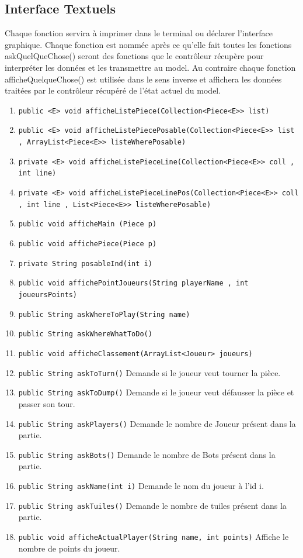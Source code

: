 \documentclass[11pt]{article}
\begin{document}
\subsection{Interface Textuels}
\label{sec:org1bb8284}
Chaque fonction servira à imprimer dans le terminal ou déclarer l'interface graphique. Chaque fonction est nommée après ce qu’elle fait toutes les fonctions askQuelQueChose() seront des fonctions que le contrôleur récupère pour interpréter les données et les transmettre au model. Au contraire chaque fonction afficheQuelqueChose() est utilisée dans le sens inverse et affichera les données traitées par le contrôleur récupéré de l'état actuel du model. 
\begin{enumerate}
\item \texttt{public <E> void afficheListePiece(Collection<Piece<E>> list)}
\item \texttt{public <E> void afficheListePiecePosable(Collection<Piece<E>> list , ArrayList<Piece<E>> listeWherePosable)}
\item \texttt{private <E> void afficheListePieceLine(Collection<Piece<E>> coll , int line)}
\item \texttt{private <E> void afficheListePieceLinePos(Collection<Piece<E>> coll , int line , List<Piece<E>> listeWherePosable)}
\item \texttt{public void afficheMain (Piece p)}
\item \texttt{public void affichePiece(Piece p)}
\item \texttt{private String posableInd(int i)}
\item \texttt{public void affichePointJoueurs(String playerName , int joueursPoints)}
\item \texttt{public String askWhereToPlay(String name)}
\item \texttt{public String askWhereWhatToDo()}
\item \texttt{public void afficheClassement(ArrayList<Joueur> joueurs)}
\item \texttt{public String askToTurn()} Demande si le joueur veut tourner la pièce.
\item \texttt{public String askToDump()} Demande si le joueur veut défausser la pièce et passer son tour.
\item \texttt{public String askPlayers()} Demande le nombre de Joueur présent dans la partie.
\item \texttt{public String askBots()} Demande le nombre de Bots présent dans la partie.
\item \texttt{public String askName(int i)} Demande le nom du joueur à l'id i.
\item \texttt{public String askTuiles()} Demande le nombre de tuiles présent dans la partie.
\item \texttt{public void afficheActualPlayer(String name, int points)} Affiche le nombre de points du joueur.
\end{enumerate}
\end{document}
